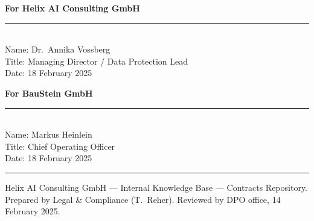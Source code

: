 \documentclass[11pt]{article}
\begin{document}
\begin{minipage}[t]{0.48\textwidth}
\textbf{For Helix AI Consulting GmbH}\\[2.5em]
\rule{0.85\textwidth}{0.4pt}\\
Name: Dr.\ Annika Vossberg\\
Title: Managing Director / Data Protection Lead\\
Date: 18 February 2025
\end{minipage}
\hfill
\begin{minipage}[t]{0.48\textwidth}
\textbf{For BauStein GmbH}\\[2.5em]
\rule{0.85\textwidth}{0.4pt}\\
Name: Markus Heinlein\\
Title: Chief Operating Officer\\
Date: 18 February 2025
\end{minipage}

\vspace{3em}
\hrule
\vspace{0.5em}
{\small Helix AI Consulting GmbH --- Internal Knowledge Base --- Contracts Repository. Prepared by Legal \& Compliance (T.\ Reher). Reviewed by DPO office, 14 February 2025.}
\end{document}
